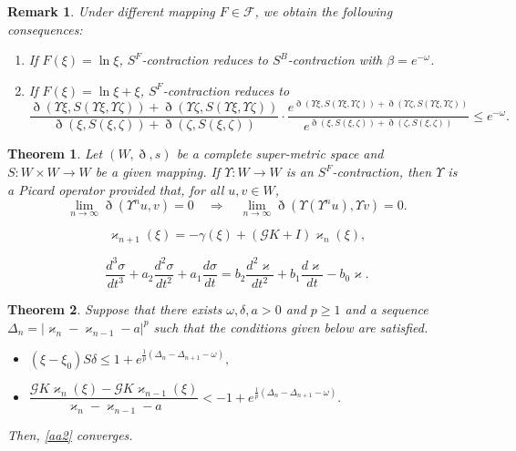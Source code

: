 \documentclass[10pt,a4paper]{amsart}
\newtheorem{remark}{Remark}
\newtheorem{theorem}{Theorem}
\begin{document}
\begin{remark}\label{remark1} Under different mapping $F \in \mathcal{F}$, we obtain the following consequences:
    \begin{enumerate}
        \item [1.] If $F(\xi)=\ln \xi $, \textit{$S^F$-contraction} reduces to \textit{$S^B$-contraction} with $\beta=e^{-\omega  }$.
        \item[2.]  If $F(\xi)=\ln \xi  +\xi$, \textit{$S^F$-contraction} reduces to
        \begin{equation*}
            \frac{\eth(\Upsilon \xi,S(\Upsilon \xi,\Upsilon \zeta))+\eth(\Upsilon \zeta,S(\Upsilon \xi,\Upsilon \zeta))}{\eth(\xi,S(\xi,\zeta))+\eth(\zeta ,S(\xi,\zeta))}\cdot\frac{e^{\eth(\Upsilon \xi,S(\Upsilon \xi,\Upsilon \zeta))+\eth(\Upsilon \zeta,S(\Upsilon \xi,\Upsilon \zeta))}}{e^{\eth(\xi,S(\xi,\zeta))+\eth(\zeta ,S(\xi,\zeta))}}\le e^{-\omega  }.
        \end{equation*}
    \end{enumerate}
\end{remark}

\begin{theorem}\label{sf theorem}
  Let $(W,\eth,s)$ be a complete super-metric space and $S:W\times W \to W$ be a given mapping. 
If $\Upsilon  : W \to W$ is an \textit{$S^F$-contraction}, then $\Upsilon $ is a \textit{Picard operator} provided that, for all $u,v \in W$,
\[
\lim_{n \to \infty} \eth(\Upsilon^n u, v) = 0 
\quad \Longrightarrow \quad 
\lim_{n \to \infty} \eth(\Upsilon(\Upsilon^n u), \Upsilon  v) = 0.
\]
\end{theorem}

\begin{equation}\label{aa2}
\varkappa_{n+1}(\xi)
= -\gamma(\xi)+(\mathcal{G}K+I)\varkappa_n(\xi),
\end{equation}

\begin{equation}\label{aa4}
\frac{d^3\sigma}{dt^3}
+a_2\frac{d^2\sigma}{dt^2}
+a_1\frac{d\sigma}{dt}
=
b_2\frac{d^2\varkappa}{dt^2}
+b_1\frac{d\varkappa}{dt}
-b_0\varkappa.
\end{equation}

\begin{theorem}\label{appth}
     Suppose that there exists $\omega  ,\delta,a>0$ and $p\ge 1$ and a sequence $\Delta_n=|\varkappa_{n}-\varkappa_{n-1}-a|^p$ such that the conditions given below are satisfied.

\begin{itemize}
\item[(F$_1$)] $(\xi - \xi_0)S\delta \le 1 + e^{\frac{1}{p}(\Delta_n-\Delta_{n+1}-\omega  )},$
\item[(F$_2$)] $\dfrac{\mathcal{G}K\varkappa_{n}(\xi) - \mathcal{G}K\varkappa_{n-1}(\xi)}{\varkappa_n - \varkappa_{n-1}-a} < -1 + e^{\frac{1}{p}(\Delta_n-\Delta_{n+1}-\omega  )}.$
\end{itemize}

Then, \eqref{aa2} converges.
\end{theorem}
\end{document}
